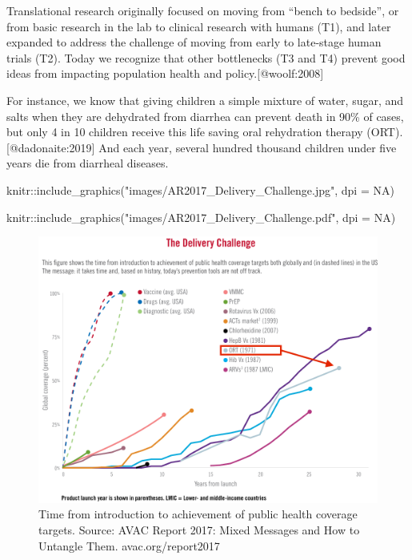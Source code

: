 \documentclass[
  letterpaper,
  DIV=11,
  numbers=noendperiod,
  oneside]{scrartcl}
\newenvironment{Shaded}{\begin{snugshade}}{\end{snugshade}}
\newcommand{\AttributeTok}[1]{\textcolor[rgb]{0.40,0.45,0.13}{#1}}
\newcommand{\ConstantTok}[1]{\textcolor[rgb]{0.56,0.35,0.01}{#1}}
\newcommand{\FunctionTok}[1]{\textcolor[rgb]{0.28,0.35,0.67}{#1}}
\newcommand{\NormalTok}[1]{\textcolor[rgb]{0.00,0.23,0.31}{#1}}
\newcommand{\SpecialCharTok}[1]{\textcolor[rgb]{0.37,0.37,0.37}{#1}}
\newcommand{\StringTok}[1]{\textcolor[rgb]{0.13,0.47,0.30}{#1}}
\begin{document}
Translational research originally focused on moving from ``bench to
bedside'', or from basic research in the lab to clinical research with
humans (T1), and later expanded to address the challenge of moving from
early to late-stage human trials (T2). Today we recognize that other
bottlenecks (T3 and T4) prevent good ideas from impacting population
health and policy.{[}@woolf:2008{]}

For instance, we know that giving children a simple mixture of water,
sugar, and salts when they are dehydrated from diarrhea can prevent
death in 90\% of cases, but only 4 in 10 children receive this life
saving oral rehydration therapy (ORT).{[}@dadonaite:2019{]} And each
year, several hundred thousand children under five years die from
diarrheal diseases.

\begin{Shaded}
\begin{Highlighting}[]
\NormalTok{knitr}\SpecialCharTok{::}\FunctionTok{include\_graphics}\NormalTok{(}\StringTok{"images/AR2017\_Delivery\_Challenge.jpg"}\NormalTok{, }\AttributeTok{dpi =} \ConstantTok{NA}\NormalTok{)}
\end{Highlighting}
\end{Shaded}

\begin{Shaded}
\begin{Highlighting}[]
\NormalTok{knitr}\SpecialCharTok{::}\FunctionTok{include\_graphics}\NormalTok{(}\StringTok{"images/AR2017\_Delivery\_Challenge.pdf"}\NormalTok{, }\AttributeTok{dpi =} \ConstantTok{NA}\NormalTok{)}
\end{Highlighting}
\end{Shaded}

\begin{figure}[H]

{\centering \includegraphics{images/AR2017_Delivery_Challenge.pdf}

}

\caption{Time from introduction to achievement of public health coverage
targets. Source: AVAC Report 2017: Mixed Messages and How to Untangle
Them. avac.org/report2017}

\end{figure}
\end{document}
